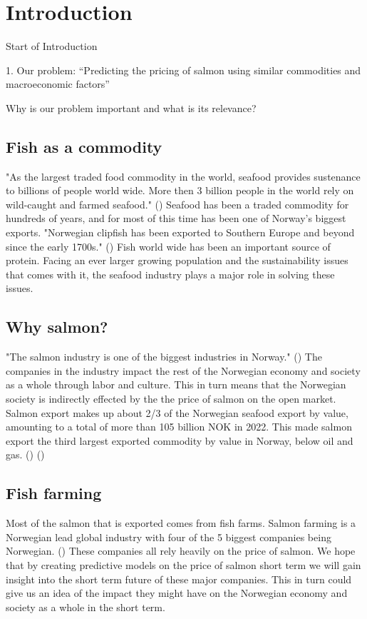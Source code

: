 \section{Introduction}
Start of Introduction

1. Our problem: “Predicting the pricing of salmon using similar commodities and macroeconomic factors” 
 
Why is our problem important and what is its relevance? 

\subsection{Fish as a commodity}
"As the largest traded food commodity in the world, seafood provides sustenance to billions of people world wide. More then 3 billion people in the world rely on wild-caught and farmed seafood." (\cite{wwf_2019}) Seafood has been a traded commodity for hundreds of years, and for most of this time has been one of Norway's biggest exports. "Norwegian clipfish has been exported to Southern Europe and beyond since the early 1700s." (\cite{seafood_from_norway_clipfish}) Fish world wide has been an important source of protein. Facing an ever larger growing population and the sustainability issues that comes with it, the seafood industry plays a major role in solving these issues.

\subsection{Why salmon?}
"The salmon industry is one of the biggest industries in Norway." (\cite{Johansen_et_al_2019}) The companies in the industry impact the rest of the Norwegian economy and society as a whole through labor and culture. This in turn means that the Norwegian society is indirectly effected by the the price of salmon on the open market. Salmon export makes up about 2/3 of the Norwegian seafood export by value, amounting to a total of more than 105 billion NOK in 2022. This made salmon export the third largest exported commodity by value in Norway, below oil and gas. (\cite{e24_gasprice_2023}) (\cite{seafood_nokkeltall})

\subsection{Fish farming}
Most of the salmon that is exported comes from fish farms. Salmon farming is a Norwegian lead global industry with four of the 5 biggest companies being Norwegian. (\cite{ilaks_2020}) These companies all rely heavily on the price of salmon. We hope that by creating predictive models on the price of salmon short term we will gain insight into the short term future of these major companies. This in turn could give us an idea of the impact they might have on the Norwegian economy and society as a whole in the short term.

